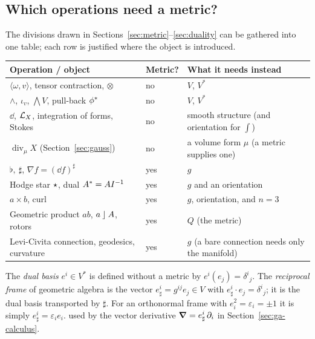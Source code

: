 \subsection{Which operations need a metric?}\label{sec:whichmetric}

The divisions drawn in Sections~\ref{sec:metric}--\ref{sec:duality} can be gathered into one table; each row is justified where the
object is introduced.

\begin{center}
\small
\renewcommand{\arraystretch}{1.3}
\begin{tabular}{@{}p{4.9cm}p{2.2cm}p{7.2cm}@{}}
\toprule
\textbf{Operation / object} & \textbf{Metric?} & \textbf{What it needs instead}\\
\midrule
$\langle\omega,v\rangle$, tensor contraction, $\otimes$ & no & $V$, $V^*$\\
$\wedge$, $\iota_v$, $\bigwedge V$, pull-back $\phi{}^{*}$ & no & $V$, $V^*$\\
$\dd$, $\mathcal{L}_X$, integration of forms, Stokes & no & smooth structure (and orientation for $\int$)\\
$\operatorname{div}_\mu X$ (Section~\ref{sec:gauss}) & no & a volume form $\mu$ (a metric supplies one)\\
$\flat,\ \sharp$, $\nabla f=(\dd f)^\sharp$ & yes & $g$\\
Hodge star $\star$, dual $A^{\ast}=AI^{-1}$ & yes & $g$ and an orientation\\
$a\times b$, curl & yes & $g$, orientation, and $n=3$\\
Geometric product $ab$, $a\mathbin{\rfloor} A$, rotors & yes & $Q$ (the metric)\\
Levi-Civita connection, geodesics, curvature & yes & $g$ (a bare connection needs only the manifold)\\
\bottomrule
\end{tabular}
\end{center}

\begin{remark}\label{rem:reciprocal}
The \emph{dual basis} $e^i\in V^*$ is defined without a metric by $e^i(e_j)=\delta^i{}_j$. The \emph{reciprocal frame} of geometric algebra is the vector $e^i_\sharp=g^{ij}e_j\in V$ with $e^i_\sharp\cdot e_j=\delta^i{}_j$; it is the dual basis transported by $\sharp$. For an orthonormal frame with $e_i^2=\varepsilon_i=\pm1$ it is simply $e^i_\sharp=\varepsilon_ie_i$.
used by the vector derivative $\boldsymbol{\nabla}=e^i_\sharp\,\partial_i$ in Section~\ref{sec:ga-calculus}.
\end{remark}
